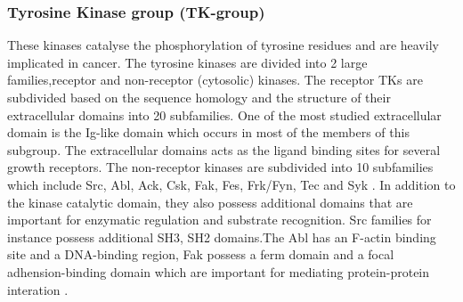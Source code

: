 \documentclass[a4paper, 11pt]{report}
\begin{document}
\subsubsection{Tyrosine Kinase group (TK-group)}
These kinases catalyse the phosphorylation of tyrosine residues and are heavily implicated in cancer. The tyrosine kinases are divided into 2 large families,receptor and non-receptor (cytosolic) kinases. The receptor TKs are subdivided based on the sequence homology and the structure of their extracellular domains into 20 subfamilies. One of the most studied extracellular domain is the Ig-like domain which occurs in most of the members of this subgroup. The extracellular domains acts as the ligand binding sites for several growth receptors. The non-receptor kinases are subdivided into 10 subfamilies which include Src, Abl, Ack, Csk, Fak, Fes, Frk/Fyn, Tec and Syk \cite{rakshambikai2015typical}. In addition to the kinase catalytic domain, they also possess additional domains that are important for enzymatic regulation and substrate recognition. Src families for instance possess additional SH3, SH2 domains.The Abl has an F-actin binding site and a DNA-binding region, Fak possess a ferm domain and a focal adhension-binding domain which are important for mediating protein-protein interation \cite{duong2013human,rakshambikai2015typical}.\\
\end{document}

